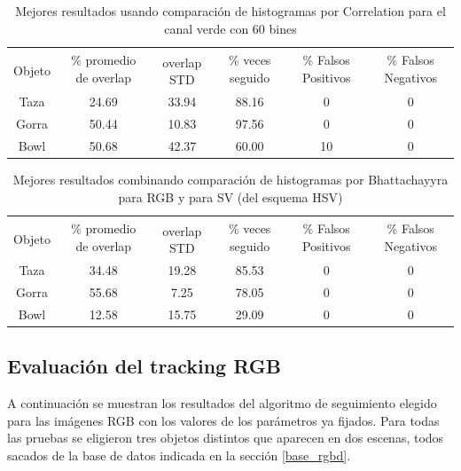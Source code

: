 \begin{table}
	\begin{tabular}{|c|c|c|c|c|c|}
	    \hline
	    & \multirow{2}{2.4cm}{\% promedio de overlap} & & \multirow{2}{2cm}{\% veces seguido} & \multirow{2}{1.6cm}{\% Falsos Positivos} & \multirow{2}{1.6cm}{\% Falsos Negativos}\\
		Objeto & & overlap STD & & &\\
	    \hline
	    Taza   & 24.69      & 33.94       & 88.16             & 0                & 0\\
	    \hline
	    Gorra  & 50.44      & 10.83       & 97.56             & 0                & 0\\
	    \hline
	    Bowl   & 50.68      & 42.37       & 60.00             & 10               & 0\\
	    \hline
    \end{tabular}
	\caption{Mejores resultados usando comparación de histogramas por Correlation para el canal verde con 60 bines}
	\label{pruebas_definitivas_correl_green}
\end{table}

\begin{table}
	\begin{tabular}{|c|c|c|c|c|c|}
	    \hline
	    & \multirow{2}{2.4cm}{\% promedio de overlap} & & \multirow{2}{2cm}{\% veces seguido} & \multirow{2}{1.6cm}{\% Falsos Positivos} & \multirow{2}{1.6cm}{\% Falsos Negativos}\\
		Objeto & & overlap STD & & &\\
	    \hline
	    Taza   & 34.48      & 19.28       & 85.53             & 0                & 0\\
	    \hline
	    Gorra  & 55.68      &  7.25       & 78.05             & 0                & 0\\
	    \hline
	    Bowl   & 12.58      & 15.75       & 29.09             & 0                & 0\\
	    \hline
    \end{tabular}
	\caption{Mejores resultados combinando comparación de histogramas por Bhattachayyra para RGB y para SV (del esquema HSV)}
	\label{pruebas_definitivas_rgb_sv}
\end{table}



\subsection{Evaluación del tracking RGB}
A continuación se muestran los resultados del algoritmo de seguimiento elegido para las imágenes RGB con los valores de los parámetros ya fijados. Para todas las pruebas se eligieron tres objetos distintos que aparecen en dos escenas, todos sacados de la base de datos indicada en la sección \ref{base_rgbd}.

